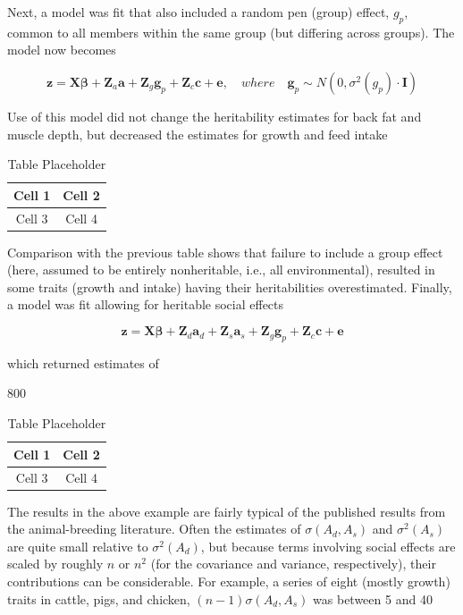 \documentclass{article}
\begin{document}
Next, a model was fit that also included a random pen (group) effect,  $ g_{p} $, common to all members within the same group (but differing across groups). The model now becomes

\begin{equation}
\mathbf{z}=\mathbf{X}\boldsymbol{\beta}+\mathbf{Z}_{a}\mathbf{a}+\mathbf{Z}_{g}\mathbf{g}_{p}+\mathbf{Z}_{c}\mathbf{c}+\mathbf{e},\quad where\quad\mathbf{g}_{p}\sim N(0,\sigma^{2}(g_{p})\cdot\mathbf{I})
\end{equation}

Use of this model did not change the heritability estimates for back fat and muscle depth, but decreased the estimates for growth and feed intake

\begin{table}[h]
\centering
\begin{tabular}{|c|c|}
\hline
Cell 1 & Cell 2 \\
\hline
Cell 3 & Cell 4 \\
\hline
\end{tabular}
\caption{Table Placeholder}
\end{table}

Comparison with the previous table shows that failure to include a group effect (here, assumed to be entirely nonheritable, i.e., all environmental), resulted in some traits (growth and intake) having their heritabilities overestimated. Finally, a model was fit allowing for heritable social effects

\begin{equation}
\mathbf{z}=\mathbf{X}\boldsymbol{\beta}+\mathbf{Z}_{d}\mathbf{a}_{d}+\mathbf{Z}_{s}\mathbf{a}_{s}+\mathbf{Z}_{g}\mathbf{g}_{p}+\mathbf{Z}_{c}\mathbf{c}+\mathbf{e}
\end{equation}

which returned estimates of

800

\begin{table}[h]
\centering
\begin{tabular}{|c|c|}
\hline
Cell 1 & Cell 2 \\
\hline
Cell 3 & Cell 4 \\
\hline
\end{tabular}
\caption{Table Placeholder}
\end{table}

The results in the above example are fairly typical of the published results from the animal-breeding literature. Often the estimates of  $ \sigma(A_d, A_s) $ and  $ \sigma^2(A_s) $ are quite small relative to  $ \sigma^2(A_d) $, but because terms involving social effects are scaled by roughly  $ n $ or  $ n^2 $ (for the covariance and variance, respectively), their contributions can be considerable. For example, a series of eight (mostly growth) traits in cattle, pigs, and chicken,  $ (n-1)\sigma(A_d, A_s) $ was between 5 and 40%
\end{document}
